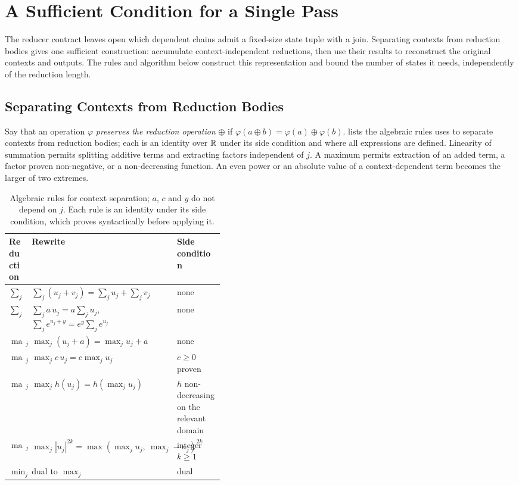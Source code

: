 \section{A Sufficient Condition for a Single Pass}
\label{sec:existence}

The reducer contract leaves open which dependent chains admit a fixed-size state tuple with a join.
Separating contexts from reduction bodies gives one sufficient construction: accumulate context-independent reductions, then use their results to reconstruct the original contexts and outputs.
The rules and algorithm below construct this representation and bound the number of states it needs, independently of the reduction length.

\subsection{Separating Contexts from Reduction Bodies}
\label{sec:freeing}

Say that an operation $\varphi$ \emph{preserves the reduction operation} $\oplus$ if $\varphi(a\oplus b)=\varphi(a)\oplus\varphi(b)$.
 lists the algebraic rules \sys uses to separate contexts from reduction bodies; each is an identity over $\mathbb{R}$ under its side condition and where all expressions are defined.
Linearity of summation permits splitting additive terms and extracting factors independent of $j$.
A maximum permits extraction of an added term, a factor proven non-negative, or a non-decreasing function.
An even power or an absolute value of a context-dependent term becomes the larger of two extremes.

\begin{table}[t]
\footnotesize
\caption{Algebraic rules for context separation; $a$, $c$ and $y$ do not depend on $j$. Each rule is an identity under its side condition, which \sys proves syntactically before applying it.}
\label{tab:rules}
\begin{tabular}{@{}llp{0.42\linewidth}@{}}
\toprule
\textbf{Reduction} & \textbf{Rewrite} & \textbf{Side condition}\\
\midrule
$\sum_j$ & $\sum_j (u_j+v_j)=\sum_j u_j+\sum_j v_j$ & none\\
$\sum_j$ & $\sum_j a\,u_j=a\sum_j u_j$, \ $\sum_j e^{u_j+y}=e^{y}\sum_j e^{u_j}$ & none\\
$\max_j$ & $\max_j (u_j+a)=\max_j u_j+a$ & none\\
$\max_j$ & $\max_j c\,u_j=c\max_j u_j$ & $c\ge 0$ proven\\
$\max_j$ & $\max_j h(u_j)=h(\max_j u_j)$ & $h$ non-decreasing on the relevant domain\\
$\max_j$ & $\max_j |u_j|^{2k}=\max(\max_j u_j,\ \max_j -u_j)^{2k}$ & integer $k\ge1$\\
$\min_j$ & dual to $\max_j$ & dual\\
\bottomrule
\end{tabular}
\end{table}

